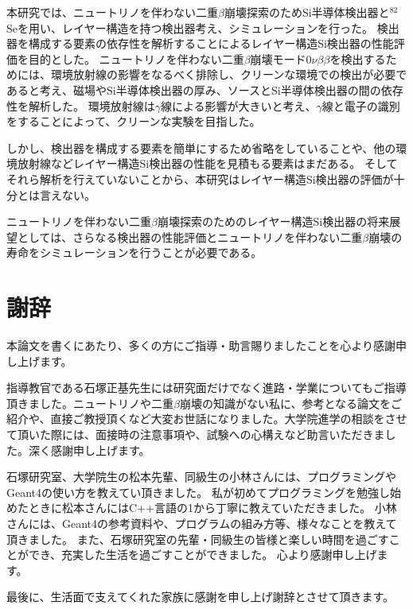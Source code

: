 \documentclass[a4paper,10pt]{jreport}
\begin{document}
本研究では、ニュートリノを伴わない二重$\beta$崩壊探索のためSi半導体検出器と$^{82}$Seを用い、レイヤー構造を持つ検出器考え、シミュレーションを行った。
検出器を構成する要素の依存性を解析することによるレイヤー構造Si検出器の性能評価を目的とした。
ニュートリノを伴わない二重$\beta$崩壊モード$0\nu\beta\beta$を検出するためには、環境放射線の影響をなるべく排除し、クリーンな環境での検出が必要であると考え、磁場やSi半導体検出器の厚み、ソースとSi半導体検出器の間の依存性を解析した。
環境放射線は$\gamma$線による影響が大きいと考え、$\gamma$線と電子の識別をすることによって、クリーンな実験を目指した。

しかし、検出器を構成する要素を簡単にするため省略をしていることや、他の環境放射線などレイヤー構造Si検出器の性能を見積もる要素はまだある。
そしてそれら解析を行えていないことから、本研究はレイヤー構造Si検出器の評価が十分とは言えない。

ニュートリノを伴わない二重$\beta$崩壊探索のためのレイヤー構造Si検出器の将来展望としては、さらなる検出器の性能評価とニュートリノを伴わない二重$\beta$崩壊の寿命をシミュレーションを行うことが必要である。



\chapter*{謝辞}

本論文を書くにあたり、多くの方にご指導・助言賜りましたことを心より感謝申し上げます。

指導教官である石塚正基先生には研究面だけでなく進路・学業についてもご指導頂きました。ニュートリノや二重$\beta$崩壊の知識がない私に、参考となる論文をご紹介や、直接ご教授頂くなど大変お世話になりました。大学院進学の相談をさせて頂いた際には、面接時の注意事項や、試験への心構えなど助言いただきました。深く感謝申し上げます。

石塚研究室、大学院生の松本先輩、同級生の小林さんには、プログラミングやGeant4の使い方を教えてい頂きました。
私が初めてプログラミングを勉強し始めたときに松本さんにはC++言語の1から丁寧に教えていただきました。
小林さんには、Geant4の参考資料や、プログラムの組み方等、様々なことを教えて頂きました。
また、石塚研究室の先輩・同級生の皆様と楽しい時間を過ごすことができ、充実した生活を過ごすことができました。
心より感謝申し上げます。

最後に、生活面で支えてくれた家族に感謝を申し上げ謝辞とさせて頂きます。
\end{document}
